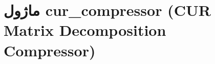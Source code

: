 \section{ماژول cur\_compressor (CUR Matrix Decomposition Compressor)}
\label{sec:module_cur_compressor}
